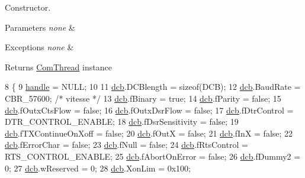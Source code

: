 Constructor. 


\begin{DoxyParams}{Parameters}
{\em none} & \\
\hline
\end{DoxyParams}

\begin{DoxyExceptions}{Exceptions}
{\em none} & \\
\hline
\end{DoxyExceptions}
\begin{DoxyReturn}{Returns}
\hyperlink{a00002}{Com\-Thread} instance 
\end{DoxyReturn}

\begin{DoxyCode}
8 \{
9     \hyperlink{a00002_a07ff1fa563f3d58110ce80c3c1796f9b}{handle} = NULL;
10 
11     \hyperlink{a00002_a9954a8d34e6014302ae1d99cf5714cc9}{dcb}.DCBlength = \textcolor{keyword}{sizeof}(DCB);
12     \hyperlink{a00002_a9954a8d34e6014302ae1d99cf5714cc9}{dcb}.BaudRate = CBR\_57600;   \textcolor{comment}{/*  vitesse */}
13         \hyperlink{a00002_a9954a8d34e6014302ae1d99cf5714cc9}{dcb}.fBinary = \textcolor{keyword}{true};
14     \hyperlink{a00002_a9954a8d34e6014302ae1d99cf5714cc9}{dcb}.fParity = \textcolor{keyword}{false};
15     \hyperlink{a00002_a9954a8d34e6014302ae1d99cf5714cc9}{dcb}.fOutxCtsFlow = \textcolor{keyword}{false};
16     \hyperlink{a00002_a9954a8d34e6014302ae1d99cf5714cc9}{dcb}.fOutxDsrFlow = \textcolor{keyword}{false};
17     \hyperlink{a00002_a9954a8d34e6014302ae1d99cf5714cc9}{dcb}.fDtrControl = DTR\_CONTROL\_ENABLE;
18     \hyperlink{a00002_a9954a8d34e6014302ae1d99cf5714cc9}{dcb}.fDsrSensitivity = \textcolor{keyword}{false};
19     \hyperlink{a00002_a9954a8d34e6014302ae1d99cf5714cc9}{dcb}.fTXContinueOnXoff = \textcolor{keyword}{false};
20     \hyperlink{a00002_a9954a8d34e6014302ae1d99cf5714cc9}{dcb}.fOutX = \textcolor{keyword}{false};
21     \hyperlink{a00002_a9954a8d34e6014302ae1d99cf5714cc9}{dcb}.fInX = \textcolor{keyword}{false};
22     \hyperlink{a00002_a9954a8d34e6014302ae1d99cf5714cc9}{dcb}.fErrorChar = \textcolor{keyword}{false};
23     \hyperlink{a00002_a9954a8d34e6014302ae1d99cf5714cc9}{dcb}.fNull = \textcolor{keyword}{false};
24     \hyperlink{a00002_a9954a8d34e6014302ae1d99cf5714cc9}{dcb}.fRtsControl = RTS\_CONTROL\_ENABLE;
25     \hyperlink{a00002_a9954a8d34e6014302ae1d99cf5714cc9}{dcb}.fAbortOnError = \textcolor{keyword}{false};
26     \hyperlink{a00002_a9954a8d34e6014302ae1d99cf5714cc9}{dcb}.fDummy2 = 0;
27     \hyperlink{a00002_a9954a8d34e6014302ae1d99cf5714cc9}{dcb}.wReserved = 0;
28     \hyperlink{a00002_a9954a8d34e6014302ae1d99cf5714cc9}{dcb}.XonLim = 0x100;

\end{DoxyCode}
